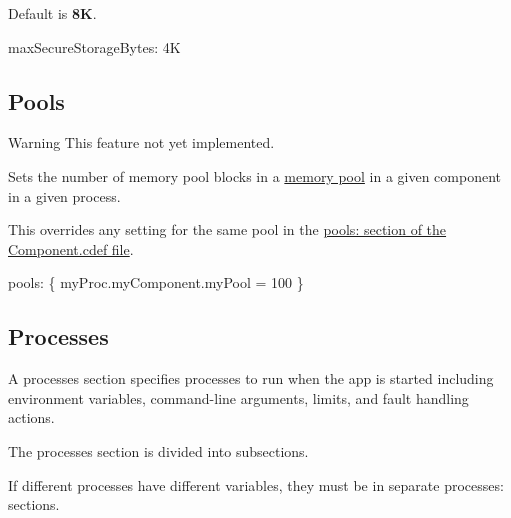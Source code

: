 Default is {\bfseries 8\+K}.

\begin{DoxyVerb}maxSecureStorageBytes: 4K
\end{DoxyVerb}
\hypertarget{def_files_adef_defFilesAdef_pools}{}\subsection{Pools}\label{def_files_adef_defFilesAdef_pools}
\begin{DoxyWarning}{Warning}
This feature not yet implemented.
\end{DoxyWarning}
Sets the number of memory pool blocks in a \hyperlink{c_memory}{memory pool} in a given component in a given process.

This overrides any setting for the same pool in the \hyperlink{def_files_cdef_defFilesCdef_pools}{pools\+: section of the Component.cdef file}.


\begin{DoxyCode}
pools:
\{
    myProc.myComponent.myPool = 100
\}
\end{DoxyCode}
\hypertarget{def_files_adef_defFilesAdef_process}{}\subsection{Processes}\label{def_files_adef_defFilesAdef_process}
A {\ttfamily processes} section specifies processes to run when the app is started including environment variables, command-\/line arguments, limits, and fault handling actions.

The {\ttfamily processes} section is divided into subsections.

If different processes have different variables, they must be in separate {\ttfamily processes\+:} sections.


